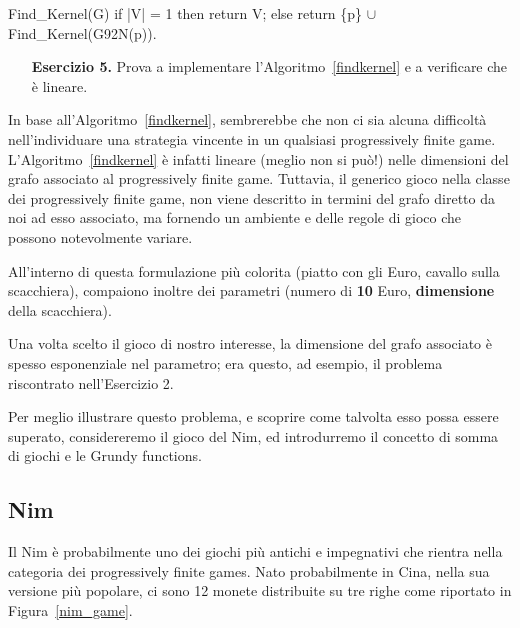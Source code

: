 \documentclass[a4paper, 10pt]{report}
\theoremstyle{definition} %
\begin{document}
\begin{minipage}{8cm}
{\small \sf
Find\_Kernel(G)\newline
    if |V| = 1 then return V;\newline
    else return \{p\} $\cup$ Find\_Kernel(G\char92N(p)).
}
\newline

\end{minipage}

\begin{enumerate}
\item [\textbf{Esercizio 5.}] Prova a implementare l'Algoritmo~\ref{findkernel}
  e a verificare che \`e lineare.
\end{enumerate}

In base all'Algoritmo~\ref{findkernel}, sembrerebbe che non ci sia alcuna
difficolt\`a nell'individuare una strategia vincente in un qualsiasi
progressively finite game. L'Algoritmo~\ref{findkernel} \`e infatti lineare
(meglio non si pu\`o!) nelle dimensioni del grafo associato al progressively
finite game. 
Tuttavia, il generico gioco nella classe dei progressively finite game, non
viene descritto in termini del grafo diretto da noi ad esso associato, ma
fornendo un ambiente e delle regole di gioco che possono notevolmente variare.

All'interno di questa formulazione pi\`u colorita (piatto con gli Euro,
cavallo sulla scacchiera), compaiono inoltre dei parametri (numero di
\textbf{10} Euro, \textbf{dimensione} della scacchiera). 

Una volta scelto il gioco di nostro interesse, la dimensione del grafo
associato \`e spesso esponenziale nel parametro; era questo, ad esempio, il
problema riscontrato nell'Esercizio 2.

Per meglio illustrare questo problema, e scoprire come talvolta esso possa
essere superato, considereremo il gioco del Nim, ed introdurremo il concetto
di somma di giochi e le Grundy functions. 


\begin{center}
\section*{Nim}
\end{center}

Il Nim \`e probabilmente uno dei giochi pi\`u antichi e impegnativi che
rientra nella categoria dei progressively finite games. Nato probabilmente in
Cina, nella sua versione pi\`u popolare, ci sono 12 monete distribuite su tre
righe come riportato in Figura~\ref{nim_game}.
\end{document}
